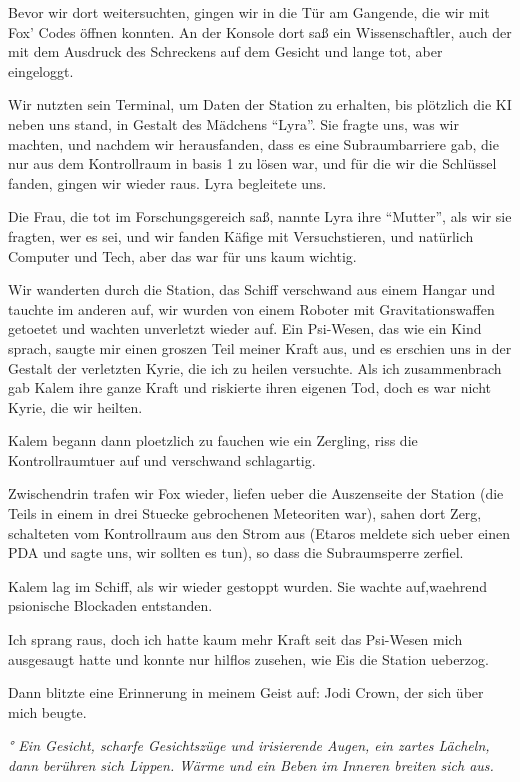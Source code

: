 \documentclass[11pt]{scrartcl}
\begin{document}
Bevor wir dort weitersuchten, gingen wir in die Tür am Gangende, die wir
mit Fox' Codes öffnen konnten. An der Konsole dort saß ein
Wissenschaftler, auch der mit dem Ausdruck des Schreckens auf dem
Gesicht und lange tot, aber eingeloggt.

Wir nutzten sein Terminal, um Daten der Station zu erhalten, bis
plötzlich die KI neben uns stand, in Gestalt des Mädchens ``Lyra''. Sie
fragte uns, was wir machten, und nachdem wir herausfanden, dass es eine
Subraumbarriere gab, die nur aus dem Kontrollraum in basis 1 zu lösen
war, und für die wir die Schlüssel fanden, gingen wir wieder raus. Lyra
begleitete uns.

Die Frau, die tot im Forschungsgereich saß, nannte Lyra ihre ``Mutter'',
als wir sie fragten, wer es sei, und wir fanden Käfige mit
Versuchstieren, und natürlich Computer und Tech, aber das war für uns
kaum wichtig.

Wir wanderten durch die Station, das Schiff verschwand aus einem Hangar
und tauchte im anderen auf, wir wurden von einem Roboter mit
Gravitationswaffen getoetet und wachten unverletzt wieder auf. Ein
Psi-Wesen, das wie ein Kind sprach, saugte mir einen groszen Teil meiner
Kraft aus, und es erschien uns in der Gestalt der verletzten Kyrie, die
ich zu heilen versuchte. Als ich zusammenbrach gab Kalem ihre ganze
Kraft und riskierte ihren eigenen Tod, doch es war nicht Kyrie, die wir
heilten.

Kalem begann dann ploetzlich zu fauchen wie ein Zergling, riss die
Kontrollraumtuer auf und verschwand schlagartig.

Zwischendrin trafen wir Fox wieder, liefen ueber die Auszenseite der
Station (die Teils in einem in drei Stuecke gebrochenen Meteoriten war),
sahen dort Zerg, schalteten vom Kontrollraum aus den Strom aus (Etaros
meldete sich ueber einen PDA und sagte uns, wir sollten es tun), so dass
die Subraumsperre zerfiel.

Kalem lag im Schiff, als wir wieder gestoppt wurden. Sie wachte
auf,waehrend psionische Blockaden entstanden.

Ich sprang raus, doch ich hatte kaum mehr Kraft seit das Psi-Wesen mich
ausgesaugt hatte und konnte nur hilflos zusehen, wie Eis die Station
ueberzog.

Dann blitzte eine Erinnerung in meinem Geist auf: Jodi Crown, der sich
über mich beugte.

\emph{° Ein Gesicht, scharfe Gesichtszüge und irisierende Augen, ein
zartes Lächeln, dann berühren sich Lippen. Wärme und ein Beben im
Inneren breiten sich aus.}
\end{document}
